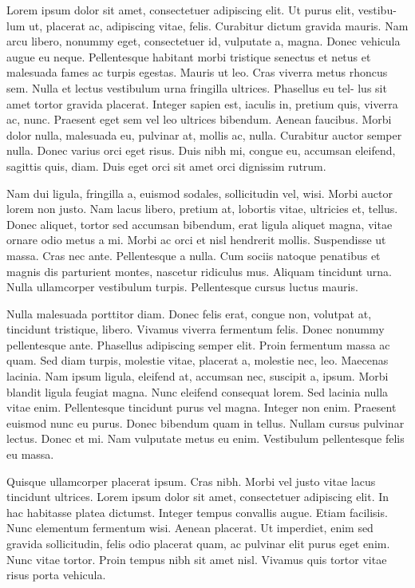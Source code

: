 Lorem ipsum dolor sit amet, consectetuer adipiscing elit. Ut purus elit, vestibu-
lum ut, placerat ac, adipiscing vitae, felis. Curabitur dictum gravida mauris.
Nam arcu libero, nonummy eget, consectetuer id, vulputate a, magna. Donec
vehicula augue eu neque. Pellentesque habitant morbi tristique senectus et
netus et malesuada fames ac turpis egestas. Mauris ut leo. Cras viverra metus
rhoncus sem. Nulla et lectus vestibulum urna fringilla ultrices. Phasellus eu tel-
lus sit amet tortor gravida placerat. Integer sapien est, iaculis in, pretium quis,
viverra ac, nunc. Praesent eget sem vel leo ultrices bibendum. Aenean faucibus.
Morbi dolor nulla, malesuada eu, pulvinar at, mollis ac, nulla. Curabitur auctor
semper nulla. Donec varius orci eget risus. Duis nibh mi, congue eu, accumsan
eleifend, sagittis quis, diam. Duis eget orci sit amet orci dignissim rutrum.

Nam dui ligula, fringilla a, euismod sodales, sollicitudin vel, wisi. Morbi auctor
lorem non justo. Nam lacus libero, pretium at, lobortis vitae, ultricies et, tellus.
Donec aliquet, tortor sed accumsan bibendum, erat ligula aliquet magna, vitae
ornare odio metus a mi. Morbi ac orci et nisl hendrerit mollis. Suspendisse ut
massa. Cras nec ante. Pellentesque a nulla. Cum sociis natoque penatibus et
magnis dis parturient montes, nascetur ridiculus mus. Aliquam tincidunt urna.
Nulla ullamcorper vestibulum turpis. Pellentesque cursus luctus mauris.

Nulla malesuada porttitor diam. Donec felis erat, congue non, volutpat at,
tincidunt tristique, libero. Vivamus viverra fermentum felis. Donec nonummy
pellentesque ante. Phasellus adipiscing semper elit. Proin fermentum massa ac
quam. Sed diam turpis, molestie vitae, placerat a, molestie nec, leo. Maecenas
lacinia. Nam ipsum ligula, eleifend at, accumsan nec, suscipit a, ipsum. Morbi
blandit ligula feugiat magna. Nunc eleifend consequat lorem. Sed lacinia nulla
vitae enim. Pellentesque tincidunt purus vel magna. Integer non enim. Praesent
euismod nunc eu purus. Donec bibendum quam in tellus. Nullam cursus pulvinar lectus.
Donec et mi. Nam vulputate metus eu enim. Vestibulum pellentesque felis eu massa.

Quisque ullamcorper placerat ipsum. Cras nibh. Morbi vel justo vitae lacus
tincidunt ultrices. Lorem ipsum dolor sit amet, consectetuer adipiscing elit. In
hac habitasse platea dictumst. Integer tempus convallis augue. Etiam facilisis.
Nunc elementum fermentum wisi. Aenean placerat. Ut imperdiet, enim sed
gravida sollicitudin, felis odio placerat quam, ac pulvinar elit purus eget enim.
Nunc vitae tortor. Proin tempus nibh sit amet nisl. Vivamus quis tortor vitae
risus porta vehicula.


